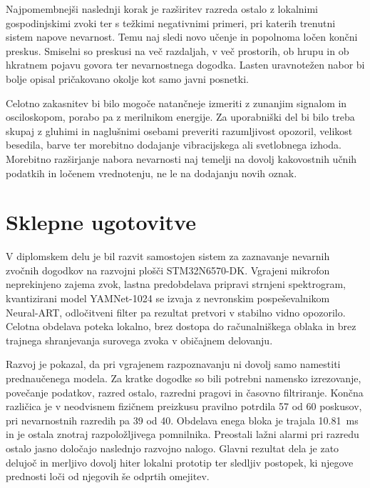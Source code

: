 Najpomembnejši naslednji korak je razširitev razreda ostalo z lokalnimi
gospodinjskimi zvoki ter s težkimi negativnimi primeri, pri katerih trenutni
sistem napove nevarnost. Temu naj sledi novo učenje in popolnoma ločen končni
preskus. Smiselni so preskusi na več razdaljah, v več prostorih, ob hrupu in ob
hkratnem pojavu govora ter nevarnostnega dogodka. Lasten uravnotežen nabor bi
bolje opisal pričakovano okolje kot samo javni posnetki.

Celotno zakasnitev bi bilo mogoče natančneje izmeriti z zunanjim signalom in
osciloskopom, porabo pa z merilnikom energije. Za uporabniški del bi bilo treba
skupaj z gluhimi in naglušnimi osebami preveriti razumljivost opozoril,
velikost besedila, barve ter morebitno dodajanje vibracijskega ali svetlobnega
izhoda. Morebitno razširjanje nabora nevarnosti naj temelji na dovolj kakovostnih
učnih podatkih in ločenem vrednotenju, ne le na dodajanju novih oznak.

\section{Sklepne ugotovitve}

V diplomskem delu je bil razvit samostojen sistem za zaznavanje nevarnih
zvočnih dogodkov na razvojni plošči STM32N6570-DK. Vgrajeni mikrofon
neprekinjeno zajema zvok, lastna predobdelava pripravi strnjeni spektrogram,
kvantizirani model YAMNet-1024 se izvaja z nevronskim
pospeševalnikom Neural-ART, odločitveni filter pa rezultat pretvori v stabilno
vidno opozorilo. Celotna obdelava poteka lokalno, brez dostopa do računalniškega
oblaka in brez trajnega shranjevanja surovega zvoka v običajnem delovanju.

Razvoj je pokazal, da pri vgrajenem razpoznavanju ni dovolj samo namestiti
prednaučenega modela. Za kratke dogodke so bili potrebni namensko izrezovanje,
povečanje podatkov, razred ostalo, razredni pragovi in časovno filtriranje.
Končna različica je v neodvisnem fizičnem preizkusu pravilno potrdila 57 od 60
poskusov, pri nevarnostnih razredih pa 39 od 40. Obdelava enega bloka je
trajala \SI{10.81}{\milli\second} in je ostala znotraj razpoložljivega
pomnilnika. Preostali lažni alarmi pri razredu ostalo jasno določajo naslednjo
razvojno nalogo. Glavni rezultat dela je zato delujoč in merljivo dovolj hiter
lokalni prototip ter sledljiv postopek, ki njegove prednosti loči od njegovih
še odprtih omejitev.

